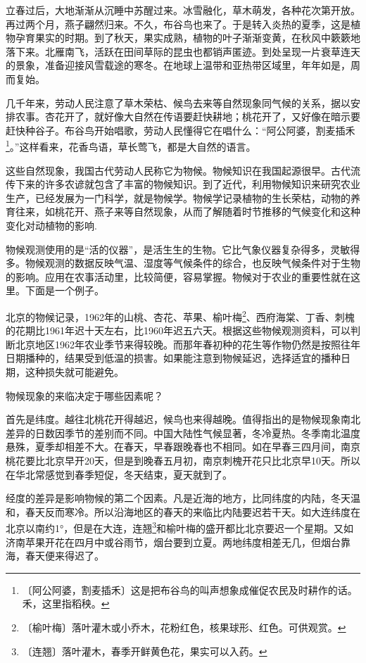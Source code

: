 \documentclass[12pt,UTF-8,openany]{ctexbook}
\begin{document}
\begin{normalsize}
    
    立春过后，大地渐渐从沉睡中苏醒过来。冰雪融化，草木萌发，各种花次第开放。再过两个月，燕子翩然归来。不久，布谷鸟也来了。于是转入炎热的夏季，这是植物孕育果实的时期。到了秋天，果实成熟，植物的叶子渐渐变黄，在秋风中簌簌地落下来。北雁南飞，活跃在田间草际的昆虫也都销声匿迹。到处呈现一片衰草连天的景象，准备迎接风雪载途的寒冬。在地球上温带和亚热带区域里，年年如是，周而复始。
    
    几千年来，劳动人民注意了草木荣枯、候鸟去来等自然现象同气候的关系，据以安排农事。杏花开了，就好像大自然在传语要赶快耕地；桃花开了，又好像在暗示要赶快种谷子。布谷鸟开始唱歌，劳动人民懂得它在唱什么：“阿公阿婆，割麦插禾\footnote{〔阿公阿婆，割麦插禾〕这是把布谷鸟的叫声想象成催促农民及时耕作的话。禾，这里指稻秧。}。”这样看来，花香鸟语，草长莺飞，都是大自然的语言。
    
    这些自然现象，我国古代劳动人民称它为物候。物候知识在我国起源很早。古代流传下来的许多农谚就包含了丰富的物候知识。到了近代，利用物候知识来研究农业生产，已经发展为一门科学，就是物候学。物候学记录植物的生长荣枯，动物的养育往来，如桃花开、燕子来等自然现象，从而了解随着时节推移的气候变化和这种变化对动植物的影响.
    
    物候观测使用的是“活的仪器”，是活生生的生物。它比气象仪器复杂得多，灵敏得多。物候观测的数据反映气温、湿度等气候条件的综合，也反映气候条件对于生物的影响。应用在农事活动里，比较简便，容易掌握。物候对于农业的重要性就在这里。下面是一个例子。
    
    北京的物候记录，1962年的山桃、杏花、苹果、榆叶梅\footnote{〔榆叶梅〕落叶灌木或小乔木，花粉红色，核果球形、红色。可供观赏。}、西府海棠、丁香、刺槐的花期比1961年迟十天左右，比1960年迟五六天。根据这些物候观测资料，可以判断北京地区1962年农业季节来得较晚。而那年春初种的花生等作物仍然是按照往年日期播种的，结果受到低温的损害。如果能注意到物候延迟，选择适宜的播种日期，这种损失就可能避免。
    
    物候现象的来临决定于哪些因素呢？
    
    首先是纬度。越往北桃花开得越迟，候鸟也来得越晚。值得指出的是物候现象南北差异的日数因季节的差别而不同。中国大陆性气候显著，冬冷夏热。冬季南北温度悬殊，夏季却相差不大。在春天，早春跟晚春也不相同。如在早春三四月间，南京桃花要比北京早开20天，但是到晚春五月初，南京刺槐开花只比北京早10天。所以在华北常感觉到春季短促，冬天结束，夏天就到了。
    
    经度的差异是影响物候的第二个因素。凡是近海的地方，比同纬度的内陆，冬天温和，春天反而寒冷。所以沿海地区的春天的来临比内陆要迟若干天。如大连纬度在北京以南约1°，但是在大连，连翘\footnote{〔连翘〕落叶灌木，春季开鲜黄色花，果实可以入药。}和榆叶梅的盛开都比北京要迟一个星期。又如济南苹果开花在四月中或谷雨节，烟台要到立夏。两地纬度相差无几，但烟台靠海，春天便来得迟了。
    

\end{normalsize}
\end{document}
